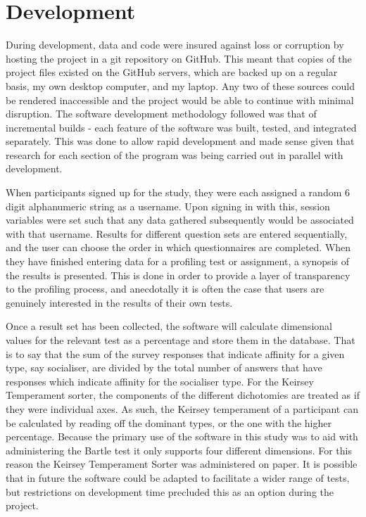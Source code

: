\documentclass[12pt,a4paper,twoside]{report}
\begin{document}
\section{Development}
During development, data and code were insured against loss or corruption by hosting the project in a git repository on GitHub. This meant that copies of the project files existed on the GitHub servers, which are backed up on a regular basis, my own desktop computer, and my laptop. Any two of these sources could be rendered inaccessible and the project would be able to continue with minimal disruption. The software development methodology followed was that of incremental builds - each feature of the software was built, tested, and integrated separately. This was done to allow rapid development and made sense given that research for each section of the program was being carried out in parallel with development.

When participants signed up for the study, they were each assigned a random 6 digit alphanumeric string as a username. Upon signing in with this, session variables were set such that any data gathered subsequently would be associated with that username. Results for different question sets are entered sequentially, and the user can choose the order in which questionnaires are completed. When they have finished entering data for a profiling test or assignment, a synopsis of the results is presented. This is done in order to provide a layer of transparency to the profiling process, and anecdotally it is often the case that users are genuinely interested in the results of their own tests.

Once a result set has been collected, the software will calculate dimensional values for the relevant test as a percentage and store them in the database. That is to say that the sum of the survey responses that indicate affinity for a given type, say socialiser, are divided by the total number of answers that have responses which indicate affinity for the socialiser type. For the Keirsey Temperament sorter, the components of the different dichotomies are treated as if they were individual axes. As such, the Keirsey temperament of a participant can be calculated by reading off the dominant types, or the one with the higher percentage. Because the primary use of the software in this study was to aid with administering the Bartle test it only supports four different dimensions. For this reason the Keirsey Temperament Sorter was administered on paper. It is possible that in future the software could be adapted to facilitate a wider range of tests, but restrictions on development time precluded this as an option during the project.
\end{document}
